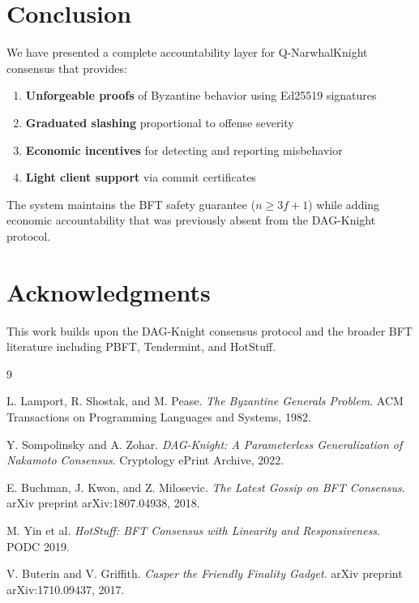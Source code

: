 \documentclass[11pt,a4paper]{article}
\begin{document}
\section{Conclusion}

We have presented a complete accountability layer for Q-NarwhalKnight consensus that provides:

\begin{enumerate}
    \item \textbf{Unforgeable proofs} of Byzantine behavior using Ed25519 signatures
    \item \textbf{Graduated slashing} proportional to offense severity
    \item \textbf{Economic incentives} for detecting and reporting misbehavior
    \item \textbf{Light client support} via commit certificates
\end{enumerate}

The system maintains the BFT safety guarantee ($n \geq 3f + 1$) while adding economic accountability that was previously absent from the DAG-Knight protocol.

\section*{Acknowledgments}

This work builds upon the DAG-Knight consensus protocol and the broader BFT literature including PBFT, Tendermint, and HotStuff.

\begin{thebibliography}{9}

L. Lamport, R. Shostak, and M. Pease.
\textit{The Byzantine Generals Problem}.
ACM Transactions on Programming Languages and Systems, 1982.

Y. Sompolinsky and A. Zohar.
\textit{DAG-Knight: A Parameterless Generalization of Nakamoto Consensus}.
Cryptology ePrint Archive, 2022.

E. Buchman, J. Kwon, and Z. Milosevic.
\textit{The Latest Gossip on BFT Consensus}.
arXiv preprint arXiv:1807.04938, 2018.

M. Yin et al.
\textit{HotStuff: BFT Consensus with Linearity and Responsiveness}.
PODC 2019.

V. Buterin and V. Griffith.
\textit{Casper the Friendly Finality Gadget}.
arXiv preprint arXiv:1710.09437, 2017.

\end{thebibliography}
\end{document}
